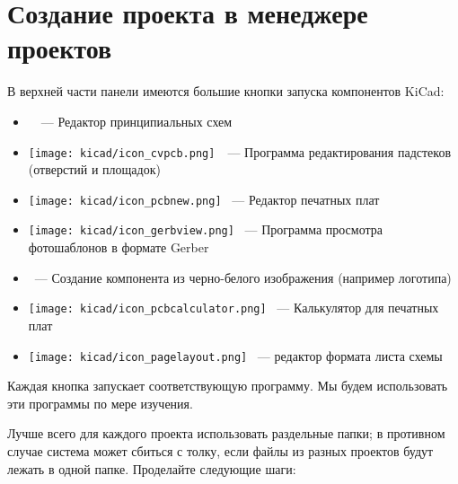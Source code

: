 \section{Создание проекта в менеджере проектов }

В верхней части панели  
имеются большие кнопки запуска компонентов KiCad:

\begin{itemize}
\item \icoesch\ \ --- Редактор принципиальных схем
\item
\texttt{[image: kicad/icon\_cvpcb.png]}\
\
--- Программа редактирования падстеков (отверстий и площадок)
\item 
\texttt{[image: kicad/icon\_pcbnew.png]}
\ ---
Редактор печатных плат
\item
\texttt{[image: kicad/icon\_gerbview.png]}
\ --- Программа просмотра фотошаблонов в формате Gerber
\item \prog{Bitmap2Component}\ --- Создание компонента из черно-белого
изображения (например логотипа)
\item 
\texttt{[image: kicad/icon\_pcbcalculator.png]}
\ --- Калькулятор для печатных плат
\item 
\texttt{[image: kicad/icon\_pagelayout.png]}
\ --- редактор формата листа схемы
\end{itemize}

Каждая кнопка запускает соответствующую программу. Мы будем использовать эти
программы по мере изучения.

\bigskip
Лучше всего для каждого проекта использовать раздельные папки; в противном
случае система может сбиться с толку, если файлы из разных проектов будут лежать
в одной папке. Проделайте следующие шаги:

